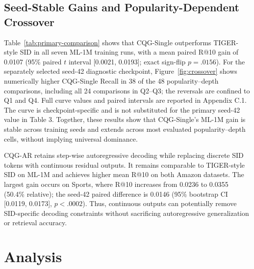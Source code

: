 \documentclass[letterpaper]{article}
\begin{document}


\subsection{Seed-Stable Gains and Popularity-Dependent Crossover}

Table~\ref{tab:primary-comparison} shows that CQG-Single outperforms
TIGER-style SID in all seven ML-1M training runs, with a mean paired R@10
gain of 0.0107 (95\% paired $t$ interval [0.0021, 0.0193]; exact sign-flip
$p=.0156$). For the separately selected seed-42 diagnostic checkpoint,
Figure~\ref{fig:crossover} shows numerically higher
CQG-Single Recall in 38 of the 48 popularity--depth comparisons, including
all 24 comparisons in Q2--Q3; the reversals are confined to Q1 and Q4.
Full curve values and paired intervals are reported in Appendix C.1. The
curve is checkpoint-specific and is not substituted for the primary
seed-42 value in Table 3. Together, these results show that CQG-Single's
ML-1M gain is stable across training seeds and extends across most evaluated
popularity--depth cells, without implying universal dominance.

CQG-AR retains step-wise autoregressive decoding while replacing discrete
SID tokens with continuous residual outputs. It remains comparable to
TIGER-style SID on ML-1M and achieves higher mean R@10 on both Amazon
datasets. The largest gain occurs on Sports, where R@10 increases from
0.0236 to 0.0355 (50.4\% relative); the seed-42 paired difference is 0.0146
(95\% bootstrap CI [0.0119, 0.0173], $p<.0002$). Thus, continuous outputs
can potentially remove SID-specific decoding constraints without sacrificing
autoregressive generalization or retrieval accuracy.

\section{Analysis}
\end{document}
